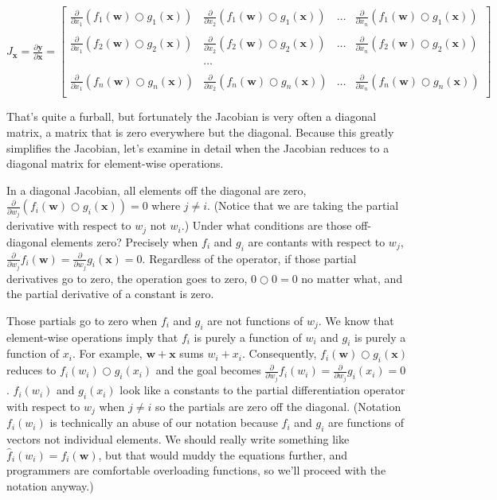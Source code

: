 \documentclass[11pt]{article}
\begin{document}
$J_\mathbf{x} = 
\frac{\partial \mathbf{y}}{\partial \mathbf{x}}  = \begin{bmatrix}
\frac{\partial}{\partial x_1} ( f_{1}(\mathbf{w}) \bigcirc g_{1}(\mathbf{x}) ) & \frac{\partial}{\partial x_2} ( f_{1}(\mathbf{w}) \bigcirc g_{1}(\mathbf{x}) ) & \ldots & \frac{\partial}{\partial x_n} ( f_{1}(\mathbf{w}) \bigcirc g_{1}(\mathbf{x}) )\\\\
\frac{\partial}{\partial x_1} ( f_{2}(\mathbf{w}) \bigcirc g_{2}(\mathbf{x}) ) & \frac{\partial}{\partial x_2} ( f_{2}(\mathbf{w}) \bigcirc g_{2}(\mathbf{x}) ) & \ldots & \frac{\partial}{\partial x_n} ( f_{2}(\mathbf{w}) \bigcirc g_{2}(\mathbf{x}) )\\\\
& \ldots\\\\
\frac{\partial}{\partial x_1} ( f_{n}(\mathbf{w}) \bigcirc g_{n}(\mathbf{x}) ) & \frac{\partial}{\partial x_2} ( f_{n}(\mathbf{w}) \bigcirc g_{n}(\mathbf{x}) ) & \ldots & \frac{\partial}{\partial x_n} ( f_{n}(\mathbf{w}) \bigcirc g_{n}(\mathbf{x}) )\\
\end{bmatrix}
$

That's quite a furball, but fortunately the Jacobian is very often a diagonal matrix, a matrix that is zero everywhere but the diagonal. Because this greatly simplifies the Jacobian, let's examine in detail when the Jacobian reduces to a diagonal matrix for element-wise operations. 

In a diagonal Jacobian, all elements off the diagonal are zero, $\frac{\partial}{\partial w_j} ( f_i(\mathbf{w}) \bigcirc g_i(\mathbf{x}) ) = 0$ where $j \neq i$. (Notice that we are taking the partial derivative with respect to $w_j$ not $w_i$.) Under what conditions are those off-diagonal elements zero? Precisely when $f_i$ and $g_i$ are contants with respect to $w_j$, $\frac{\partial}{\partial w_j} f_i(\mathbf{w}) = \frac{\partial}{\partial w_j} g_i(\mathbf{x}) = 0$.  Regardless of the operator, if those partial derivatives go to zero, the operation goes to zero, $0 \bigcirc 0 = 0$ no matter what, and the partial derivative of a constant is zero.

Those partials go to zero when $f_i$ and $g_i$ are not functions of $w_j$. We know that element-wise operations imply that $f_i$ is purely a function of $w_i$ and $g_i$  is purely a function of $x_i$. For example, $\mathbf{w}+\mathbf{x}$ sums $w_i + x_i$. Consequently,  $f_i(\mathbf{w}) \bigcirc g_i(\mathbf{x})$ reduces to $f_i(w_i) \bigcirc g_i(x_i)$ and the goal becomes $\frac{\partial}{\partial w_j} f_i(w_i) = \frac{\partial}{\partial w_j} g_i(x_i) = 0$. $f_i(w_i)$ and $g_i(x_i)$ look like a constants to the partial differentiation operator with respect to $w_j$ when $j \neq i$ so the partials are zero off the diagonal. (Notation $f_i(w_i)$ is technically an abuse of our notation because $f_i$ and $g_i$ are functions of vectors not individual elements. We should really write something like $\hat f_{i}(w_i) = f_{i}(\mathbf{w})$, but that would muddy the equations further, and programmers are comfortable overloading functions, so we'll proceed with the notation anyway.)  
\end{document}
